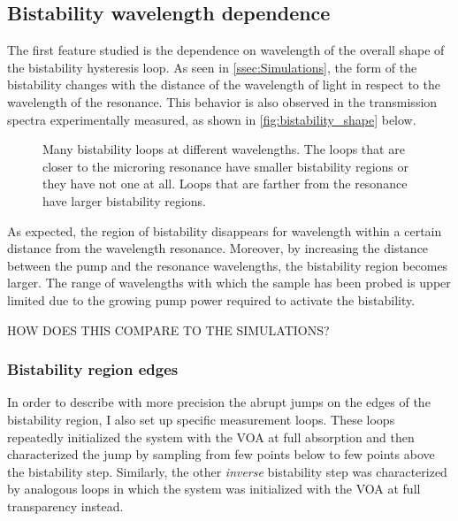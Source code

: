 \subsection{Bistability wavelength dependence}
\label{ssec:bistability_wavelength_dependence}
The first feature studied is the dependence on wavelength of the overall shape of the bistability hysteresis loop.
As seen in \autoref{ssec:Simulations}, the form of the bistability changes with the distance of the wavelength of light in respect to the wavelength of the resonance.
This behavior is also observed in the transmission spectra experimentally measured, as shown in \autoref{fig:bistability_shape} below.

\begin{figure}[hbtp]
	\centering
	
	\caption{Many bistability loops at different wavelengths.
		The loops that are closer to the microring resonance have smaller bistability regions or they have not one at all.
		Loops that are farther from the resonance have larger bistability regions.}
	\label{fig:bistability_shape}
\end{figure}

As expected, the region of bistability disappears for wavelength within a certain distance from the wavelength resonance.
Moreover, by increasing the distance between the pump and the resonance wavelengths, the bistability region becomes larger.
The range of wavelengths with which the sample has been probed is upper limited due to the growing pump power required to activate the bistability.

HOW DOES THIS COMPARE TO THE SIMULATIONS?

\subsubsection{Bistability region edges}
\label{sssec:bistability_region_edges}
In order to describe with more precision the abrupt jumps on the edges of the bistability region, I also set up specific measurement loops.
These loops repeatedly initialized the system with the \ac{VOA} at full absorption and then characterized the jump by sampling from few points below to few points above the bistability step.
Similarly, the other \textit{inverse} bistability step was characterized by analogous loops in which the system was initialized with the VOA at full transparency instead.

